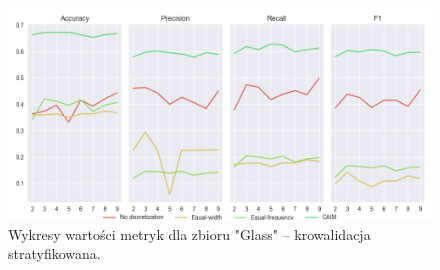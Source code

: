 \begin{figure}[H]
    \includegraphics[width=\textwidth]{img/cv_scores_stratifiedkfold/scoring_stratifiedkfold_glass.png}
    \caption{Wykresy wartości metryk dla zbioru "Glass" -- krowalidacja stratyfikowana.}
\end{figure}

